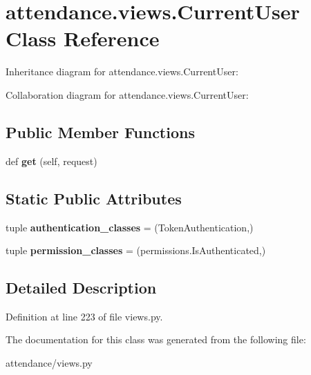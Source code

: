 \hypertarget{classattendance_1_1views_1_1_current_user}{}\section{attendance.\+views.\+Current\+User Class Reference}
\label{classattendance_1_1views_1_1_current_user}


Inheritance diagram for attendance.\+views.\+Current\+User\+:


Collaboration diagram for attendance.\+views.\+Current\+User\+:
\subsection*{Public Member Functions}
\begin{DoxyCompactItemize}
\item 
\hypertarget{classattendance_1_1views_1_1_current_user_a9fe7aeab3b63a1b822e50b8a76b65ae9}{}\label{classattendance_1_1views_1_1_current_user_a9fe7aeab3b63a1b822e50b8a76b65ae9} 
def {\bfseries get} (self, request)
\end{DoxyCompactItemize}
\subsection*{Static Public Attributes}
\begin{DoxyCompactItemize}
\item 
\hypertarget{classattendance_1_1views_1_1_current_user_af92ef88b0bb0aca432c1c039df720a89}{}\label{classattendance_1_1views_1_1_current_user_af92ef88b0bb0aca432c1c039df720a89} 
tuple {\bfseries authentication\+\_\+classes} = (Token\+Authentication,)
\item 
\hypertarget{classattendance_1_1views_1_1_current_user_addff8c937c8d1029dfa8f5dd7b697cad}{}\label{classattendance_1_1views_1_1_current_user_addff8c937c8d1029dfa8f5dd7b697cad} 
tuple {\bfseries permission\+\_\+classes} = (permissions.\+Is\+Authenticated,)
\end{DoxyCompactItemize}


\subsection{Detailed Description}


Definition at line 223 of file views.\+py.



The documentation for this class was generated from the following file\+:\begin{DoxyCompactItemize}
\item 
attendance/views.\+py\end{DoxyCompactItemize}
